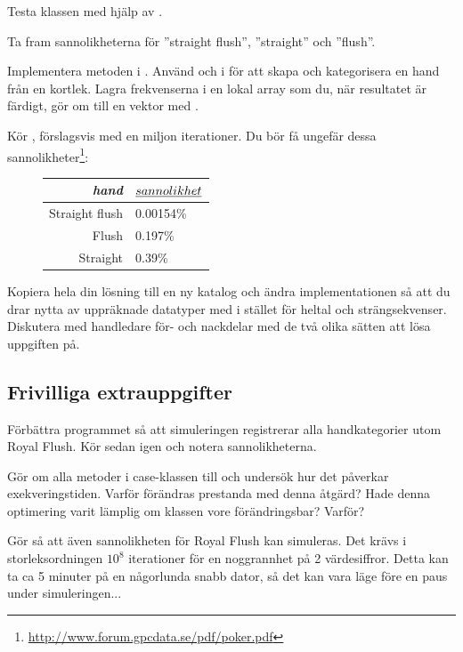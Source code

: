 \Subtask Testa klassen  med hjälp av .


\Task Ta fram sannolikheterna för ''straight flush'', ''straight'' och ''flush''.

\Subtask Implementera metoden  i . Använd  och  i  för att skapa och kategorisera en hand från en kortlek. Lagra frekvenserna i en lokal array som du, när resultatet är färdigt, gör om till en vektor med .

\Subtask Kör , förslagsvis med en miljon iterationer. Du bör få ungefär dessa sannolikheter\footnote{\url{http://www.forum.gpcdata.se/pdf/poker.pdf}}:
\begin{figure}[H]\centering
\begin{tabular}{r|l}
\emph{hand} & $\emph{sannolikhet}$ \\ \hline
Straight flush & 0.00154\%  \\
Flush          & 0.197\%    \\
Straight       & 0.39\%     \\
\end{tabular}
\end{figure}

\Task Kopiera hela din lösning till en ny katalog och ändra implementationen så att du drar nytta av uppräknade datatyper med  i stället för heltal och strängsekvenser. Diskutera med handledare för- och nackdelar med de två olika sätten att lösa uppgiften på. 

\subsection{Frivilliga extrauppgifter}


\Task Förbättra programmet så att simuleringen registrerar alla handkategorier utom Royal Flush. Kör sedan  igen och notera sannolikheterna.

\Task Gör om alla metoder i case-klassen  till  och undersök hur det påverkar exekveringstiden. Varför förändras prestanda med denna åtgärd? Hade denna optimering varit lämplig om klassen  vore förändringsbar? Varför?

\Task Gör så att även sannolikheten för Royal Flush kan simuleras. Det krävs i storleksordningen $10^8$ iterationer för en noggrannhet på 2 värdesiffror. Detta kan ta ca 5 minuter på en någorlunda snabb dator, så det kan vara läge före en paus under simuleringen...

